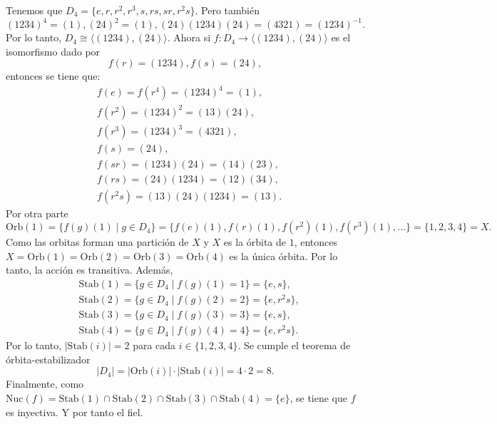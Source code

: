 \documentclass[11pt,letterpaper]{article}
\begin{document}
\begin{Solucion}
    Tenemos que \(D_4=\{e,r,r^2,r^3,s,rs,sr,r^2s\}\). Pero también
    \[(1234)^4=(1), (24)^2=(1), (24)(1234)(24)=(4321)=(1234)^{-1}.\]
    Por lo tanto, \(D_4 \cong \langle (1234), (24) \rangle\). Ahora si \(f : D_4 \rightarrow \langle (1234), (24) \rangle\) es el isomorfismo dado por 
    \[f(r)=(1234), f(s)=(24),\] entonces se tiene que:
    \begin{align*}
        &f(e)=f(r^4)=(1234)^4=(1), \\
        &f(r^2)=(1234)^2=(13)(24), \\
        &f(r^3)=(1234)^3=(4321), \\
        &f(s)=(24), \\
        &f(sr)=(1234)(24)=(14)(23), \\
        &f(rs)=(24)(1234)=(12)(34), \\
        &f(r^2s)=(13)(24)(1234)=(13).
    \end{align*}
    Por otra parte \[ \mathrm{Orb}(1)=\{ f(g)(1) \mid g \in D_4\} =\{ f(e)(1),f(r)(1), f(r^2)(1), f(r^3)(1), \ldots \}=\{1,2,3,4\}= X. \]
    Como las orbitas forman una partición de \(X\) y \(X\) es la órbita de \(1\), entonces 
    \(X=\mathrm{Orb}(1)=\mathrm{Orb}(2)=\mathrm{Orb}(3)=\mathrm{Orb}(4)\) es la única órbita. Por lo tanto, la acción es transitiva. Además,
    \begin{align*}
        &\mathrm{Stab}(1)=\{g \in D_4 \mid f(g)(1)=1\}=\{e,s \}, \\
        &\mathrm{Stab}(2)=\{g \in D_4 \mid f(g)(2)=2\}=\{e,r^2s\}, \\
        &\mathrm{Stab}(3)=\{g \in D_4 \mid f(g)(3)=3\}=\{e,s\}, \\
        &\mathrm{Stab}(4)=\{g \in D_4 \mid f(g)(4)=4\}=\{e,r^2s\}.
    \end{align*}
    Por lo tanto, \(|\mathrm{Stab}(i)|=2\) para cada \(i\in \{1,2,3,4\}\). Se cumple el teorema de órbita-estabilizador
    \[|D_4|=|\mathrm{Orb}(i)|\cdot |\mathrm{Stab}(i)|=4\cdot 2=8.\]
    Finalmente, como \(\mathrm{Nuc}(f)=\mathrm{Stab}(1)\cap\mathrm{Stab}(2)\cap\mathrm{Stab}(3)\cap\mathrm{Stab}(4)=\{e\}\), se tiene que \(f\) es inyectiva. Y por tanto el fiel.
\end{Solucion}
\end{document}
